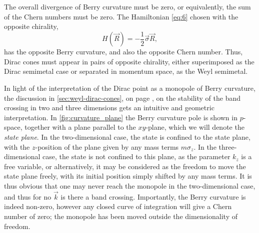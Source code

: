 The overall divergence of Berry curvature must be zero, or equivalently, the sum of the Chern numbers must be zero.
The Hamiltonian \cref{eq:6} chosen with the opposite chirality,
\begin{equation}
  H(\vec{R}) = -\frac{1}{2} \vec{\sigma} \vec{R},
\end{equation}
has the opposite Berry curvature, and also the opposite Chern number.
Thus, Dirac cones must appear in pairs of opposite chirality, either superimposed as the Dirac semimetal case or separated in momentum space, as the Weyl semimetal.

In light of the interpretation of the Dirac point as a monopole of Berry curvature, the discussion in \cref{sec:weyl-dirac-cones}, on page \pageref{sec:stability-of-gap}, on the stability of the band crossing in two and three dimensions gets an intuitive and geometric interpretation.
In \cref{fig:curvature_plane} the Berry curvature pole is shown in $p$-space, together with a plane parallel to the $xy$-plane, which we will denote the \emph{state plane}.
In the two-dimensional case, the state is confined to the state plane, with the $z$-position of the plane given by any mass terms $m \sigma _z$.
In the three-dimensional case, the state is not confined to this plane, as the parameter $k_z$ is a free variable, or alternatively, it may be considered as the freedom to move the state plane freely, with its initial position simply shifted by any mass terms.
It is thus obvious that one may never reach the monopole in the two-dimensional case, and thus for no $\vec{k}$ is there a band crossing.
Importantly, the Berry curvature is indeed non-zero, however any closed  curve of integration will give a Chern number of zero;
the  monopole has been moved outside the dimensionality of freedom.
